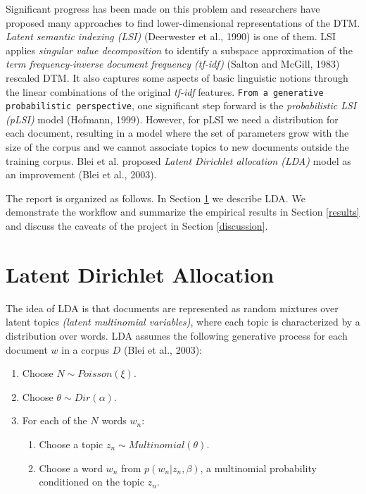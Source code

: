\documentclass{article}
\begin{document}
Significant progress has been made on this problem and researchers have proposed many approaches to find lower-dimensional representations of the DTM. \emph{Latent semantic indexing (LSI)} (Deerwester et al., 1990) is one of them. LSI applies \emph{singular value decomposition} to identify a subspace approximation of the \emph{term frequency-inverse document frequency (tf-idf)} (Salton and McGill, 1983) rescaled DTM. It also captures some aspects of basic linguistic notions through the linear combinations of the original \emph{tf-idf} features. \verb+From a generative probabilistic perspective+, one significant step forward is the \emph{probabilistic LSI (pLSI)} model (Hofmann, 1999). However, for pLSI we need a distribution for each document, resulting in a model where the set of parameters grow with the size of the corpus and we cannot associate topics to new documents outside the training corpus. Blei et al. proposed \emph{Latent Dirichlet allocation (LDA)} model as an improvement (Blei et al., 2003).

The report is organized as follows. In Section \ref{lda} we describe LDA. We demonstrate the workflow and summarize the empirical results in Section \ref{results} and discuss the caveats of the project in Section \ref{discussion}.

\section{Latent Dirichlet Allocation}
\label{lda}

The idea of LDA is that documents are represented as random mixtures over latent topics \emph{(latent multinomial variables)}, where each topic is characterized by a distribution over words. LDA assumes the following generative process for each document $w$ in a corpus $D$ (Blei et al., 2003):

\begin{enumerate}
\item Choose $N \sim Poisson(\xi).$
\item Choose $\theta \sim Dir(\alpha).$
\item For each of the $N$ words $w_n$:
    \begin{enumerate}
    \item Choose a topic $z_n \sim Multinomial(\theta)$.
    \item Choose a word $w_n$ from $p(w_n | z_n, \beta)$, a multinomial probability conditioned on the topic $z_n$.
  \end{enumerate}
\end{enumerate}
\end{document}

